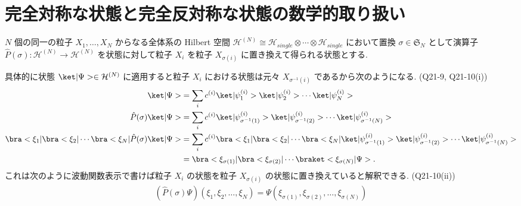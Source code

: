 \documentclass[uplatex,dvipdfmx,a4paper,11pt]{jlreq}
\newcommand{\HH}{\mathcal{H}}
\renewcommand{\SS}{\mathfrak{S}}
\numberwithin{equation}{section}
\theoremstyle{definition}
\begin{document}
\section{完全対称な状態と完全反対称な状態の数学的取り扱い}
\begin{definition}
  $N$ 個の同一の粒子 $X_1,\ldots,X_N$ からなる全体系の Hilbert 空間 $\HH^{(N)}\cong\HH_{single}\otimes\cdots\otimes\HH_{single}$ において置換 $\sigma\in\SS_N$ として演算子 $\hat{P}(\sigma): \HH^{(N)}\to\HH^{(N)}$ を状態に対して粒子 $X_i$ を粒子 $X_{\sigma(i)}$ に置き換えて得られる状態とする.
\end{definition}

具体的に状態 $\ket|\Psi>\in\HH^{(N)}$ に適用すると粒子 $X_i$ における状態は元々 $X_{\sigma^{-1}(i)}$ であるから次のようになる. (Q21-9, Q21-10(i))
\begin{align}
  \ket|\Psi>                                                       & = \sum_{i}c^{(i)}\ket|\psi_1^{(i)}>\ket|\psi_2^{(i)}>\cdots\ket|\psi_N^{(i)}>                                                                                     \\
  \hat{P}(\sigma)\ket|\Psi>                                        & = \sum_{i}c^{(i)}\ket|\psi_{\sigma^{-1}(1)}^{(i)}>\ket|\psi_{\sigma^{-1}(2)}^{(i)}>\cdots\ket|\psi_{\sigma^{-1}(N)}^{(i)}>                                        \\
  \bra<\xi_1|\bra<\xi_2|\cdots\bra<\xi_N|\hat{P}(\sigma)\ket|\Psi> & = \sum_{i}c^{(i)}\bra<\xi_1|\bra<\xi_2|\cdots\bra<\xi_N|\ket|\psi_{\sigma^{-1}(1)}^{(i)}>\ket|\psi_{\sigma^{-1}(2)}^{(i)}>\cdots\ket|\psi_{\sigma^{-1}(N)}^{(i)}> \\
                                                                   & = \bra<\xi_{\sigma(1)}|\bra<\xi_{\sigma(2)}|\cdots\braket<\xi_{\sigma(N)}|\Psi>.
\end{align}
これは次のように波動関数表示で書けば粒子 $X_i$ の状態を粒子 $X_{\sigma(i)}$ の状態に置き換えていると解釈できる. (Q21-10(ii))
\begin{align}
  (\hat{P}(\sigma)\Psi)(\xi_1,\xi_2,\ldots,\xi_N) = \Psi(\xi_{\sigma(1)},\xi_{\sigma(2)},\ldots,\xi_{\sigma(N)})
\end{align}
\end{document}
